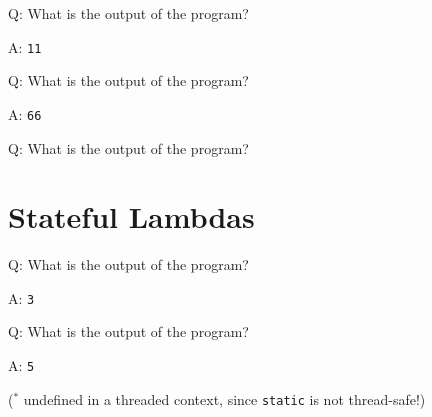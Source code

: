 \begin{frame}[fragile]{Q: What is the output of the program?}
\end{frame}

\begin{frame}[fragile]{A: \texttt{11}}
\end{frame}

\begin{frame}[fragile]{Q: What is the output of the program?}
\end{frame}

\begin{frame}[fragile]{A: \texttt{66}}
\end{frame}

\begin{frame}[fragile]{Q: What is the output of the program?}

\end{frame}

\begin{frame}
    \centering
    \scalebox{3}{Stateful Lambdas}
\end{frame}

\section{Stateful Lambdas}

\begin{frame}[fragile]{Q: What is the output of the program?}
\end{frame}

\begin{frame}[fragile]{A: \texttt{3}}
\end{frame}

\begin{frame}[fragile]{Q: What is the output of the program?}
\end{frame}

\begin{frame}[fragile]{A: \texttt{5}}

    \begin{center}
        ($^*$ undefined in a threaded context, since \texttt{static} is not thread-safe!)
    \end{center}
\end{frame}

